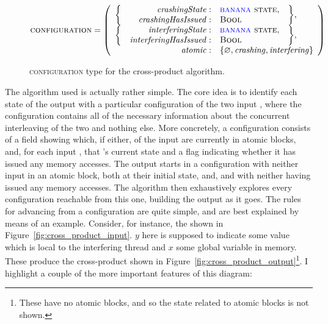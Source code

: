 \begin{figure}
  \begin{displaymath}
    \textsc{configuration} = \left(\begin{array}{rrll}
      \multirow{2}{*}{\bigg\{} & \mathit{crashingState}: & \textsc{{\StateMachine} state}, & \multirow{2}{*}{\bigg\},}\\
                               & \mathit{crashingHasIssued}: & \textsc{Bool}\\
      \multirow{2}{*}{\bigg\{} & \mathit{interferingState}: & \textsc{{\StateMachine} state}, & \multirow{2}{*}{\bigg\},} \\
                               & \mathit{interferingHasIssued}: & \textsc{Bool}\\
      \multicolumn{2}{r}{\mathit{atomic}:} & \multicolumn{2}{l}{\{ \varnothing, \mathit{crashing}, \mathit{interfering} \}}
    \end{array}\right)
  \end{displaymath}
  \caption{\textsc{configuration} type for the cross-product algorithm.}
  \label{fig:cross_product:configuration}
\end{figure}

The algorithm used is actually rather simple.  The core idea is to
identify each state of the output {\StateMachine} with a particular
configuration of the two input {\StateMachines}, where the
configuration contains all of the necessary information about the
concurrent interleaving of the two {\StateMachines} and nothing else.
More concretely, a configuration consists of a field showing which, if
either, of the input {\StateMachines} are currently in atomic blocks,
and, for each input {\StateMachine}, that {\StateMachine}'s current
state and a flag indicating whether it has issued any memory accesses.
The output {\StateMachine} starts in a configuration with neither
input {\StateMachine} in an atomic block, both {\StateMachines} at
their initial state, and, and with neither having issued any memory
accesses.  The algorithm then exhaustively explores every
configuration reachable from this one, building the output
{\StateMachine} as it goes.  The rules for advancing from a
configuration are quite simple, and are best explained by means of an
example.  Consider, for instance, the {\StateMachines} shown in
Figure~\ref{fig:cross_product_input}.  $y$ here is supposed to
indicate some value which is local to the interfering thread
{\StateMachine} and $x$ some global variable in memory.  These produce
the cross-product {\StateMachine} shown in
Figure~\ref{fig:cross_product_output}\footnote{These {\StateMachines}
  have no atomic blocks, and so the state related to atomic blocks is
  not shown.}.  I highlight a couple of the more important features of
this diagram:

